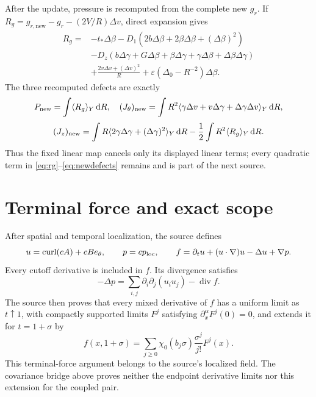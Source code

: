 \documentclass[11pt]{article}
\newcommand{\dd}{\,\mathrm d}
\begin{document}
After the update, pressure is recomputed from the complete new $g_r$.  If
$R_g=g_{r,\mathrm{new}}-g_r-(2V/R)\Delta v$, direct expansion gives
\begin{align}
 R_g={}&-t_*\Delta\beta-D_1(2b\Delta\beta+2\beta\Delta\beta+(\Delta\beta)^2)\\
 &-D_z(b\Delta\gamma+G\Delta\beta+\beta\Delta\gamma+\gamma\Delta\beta+\Delta\beta\Delta\gamma)\\
 &+\frac{2v\Delta v+(\Delta v)^2}{R}+\varepsilon(\Delta_0-R^{-2})\Delta\beta .\label{eq:rg}
\end{align}
The three recomputed defects are exactly
\begin{equation}
 P_{\rm new}=\int\langle R_g\rangle_Y\dd R,\quad
 (J_\theta)_{\rm new}=\int R^2\langle\gamma\Delta v+v\Delta\gamma+\Delta\gamma\Delta v\rangle_Y\dd R,
\end{equation}
\begin{equation}
 (J_z)_{\rm new}=\int R\langle2\gamma\Delta\gamma+(\Delta\gamma)^2\rangle_Y\dd R
 -\frac12\int R^2\langle R_g\rangle_Y\dd R.\label{eq:newdefects}
\end{equation}
Thus the fixed linear map cancels only its displayed linear terms; every quadratic term in
\eqref{eq:rg}--\eqref{eq:newdefects} remains and is part of the next source.

\section{Terminal force and exact scope}
After spatial and temporal localization, the source defines
\begin{equation}
 u=\operatorname{curl}(cA)+cB e_\theta,\qquad p=cp_{\rm loc},\qquad
 f=\partial_tu+(u\cdot\nabla)u-\Delta u+\nabla p.\label{eq:force}
\end{equation}
Every cutoff derivative is included in $f$.  Its divergence satisfies
\begin{equation}
 -\Delta p=\sum_{i,j}\partial_i\partial_j(u_i u_j)-\operatorname{div}f.\label{eq:poisson}
\end{equation}
The source then proves that every mixed derivative of $f$ has a uniform limit as $t\uparrow1$,
with compactly supported limits $F^j$ satisfying $\partial_x^\alpha F^j(0)=0$, and extends it
for $t=1+\sigma$ by
\begin{equation}
 f(x,1+\sigma)=\sum_{j\ge0}\chi_0(b_j\sigma)\frac{\sigma^j}{j!}F^j(x).\label{eq:forceextension}
\end{equation}
This terminal-force argument belongs to the source's localized field.  The covariance bridge
above proves neither the endpoint derivative limits nor this extension for the coupled pair.
\end{document}
